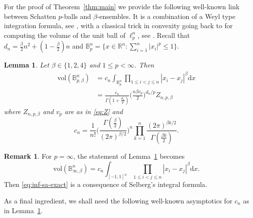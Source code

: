 \documentclass[a4paper,12pt,reqno]{amsart}
\newtheorem{lemma}[theorem]{Lemma}
\theoremstyle{definition}
\newtheorem{remark}[theorem]{Remark}
\newcommand{\IB}{\mathbb{B}}
\newcommand{\IR}{\mathbb{R}}
\newcommand{\vol}{\mathrm{vol}}
\newcommand{\dd}{\mathrm{d}}
\newcommand{\bpb}{\mathbb{B}_{p,\beta}^n}
\begin{document}
For the proof of Theorem~\ref{thm:main} we provide the following well-known link between Schatten $p$-balls and $\beta$-ensembles. It is a combination of a Weyl type integration formula, see \cite{AGZ10,SR84}, with a classical trick in convexity going back to \cite{Dir39} for computing the volume of the unit ball of $\ell_p^n$, see \cite{DFG+23,GP07,KMP98}. Recall that $d_n=\frac{\beta}{2}n^2+(1-\frac{\beta}{2})n$ and $\IB_p^n=\{x\in \IR^n\colon \sum_{i=1}^{n}|x_i|^p\le 1\}$.

\begin{lemma} \label{lem:vol-partition}
Let $\beta\in\{1,2,4\}$ and $1\le p<\infty$. Then
\begin{align*}
\vol(\bpb)
&=c_n\int_{\IB_p^n} \prod_{1\le i< j\le n}|x_i-x_j|^{\beta}\dd x\\
&=\frac{c_{n}}{\Gamma(1+\frac{d_n}{p})}\Big(\frac{n\beta v_p}{2}\Big)^{d_n/p}Z_{n,p,\beta}
\end{align*}
where $Z_{n,p,\beta}$ and $v_p$ are as in \eqref{eq:Z} and
\[
c_{n}
=\frac{1}{n!}\bigg(\frac{\Gamma(\frac{\beta}{2})}{(2\pi)^{\beta/2}}\bigg)^{n}\prod_{k=1}^n\frac{(2\pi)^{\beta k/2}}{\Gamma(\frac{\beta k}{2})}.
\]
\end{lemma}

\begin{remark}\label{rem:infty-non-sa}
For $p=\infty$, the statement of Lemma~\ref{lem:vol-partition} becomes
\[
\vol(\IB_{\infty,\beta}^n)
=c_n\int_{[-1,1]^n} \prod_{1\le i< j\le n}|x_i-x_j|^{\beta}\dd x.
\]
Then \eqref{eq:inf-sa-exact} is a consequence of Selberg's integral formula.
\end{remark}

As a final ingredient, we shall need the following well-known asymptotics for $c_{n}$ as in Lemma~\ref{lem:vol-partition}. 
\end{document}
